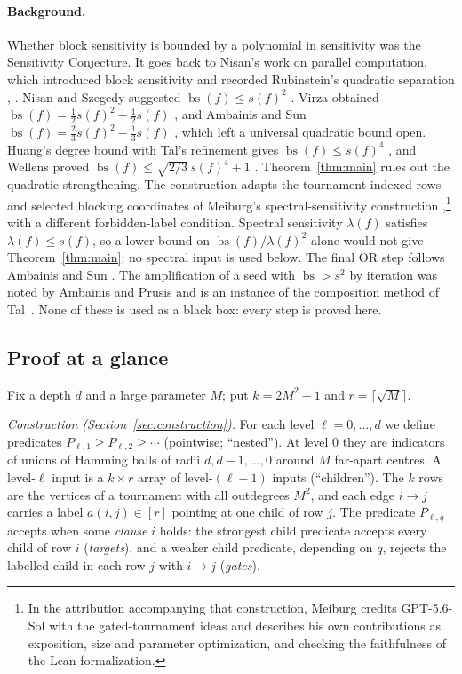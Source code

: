 \documentclass[11pt]{article}
\newcommand{\bs}{\operatorname{bs}}
\theoremstyle{definition}
\theoremstyle{remark}
\begin{document}
\paragraph{Background.}
Whether block sensitivity is bounded by a polynomial in sensitivity was the
Sensitivity Conjecture. It goes back to Nisan's work on parallel computation,
which introduced block sensitivity and recorded Rubinstein's quadratic
separation \cite[Section~2]{Nisan1989}, \cite{Rubinstein1995}. Nisan and
Szegedy suggested $\bs(f)\le s(f)^2$ \cite[Section~4]{NisanSzegedy1994}.
Virza obtained $\bs(f)=\tfrac12s(f)^2+\tfrac12s(f)$ \cite{Virza2011}, and
Ambainis and Sun $\bs(f)=\tfrac23s(f)^2-\tfrac13s(f)$
\cite[Theorem~1]{AmbainisSun2011}, which left a universal quadratic bound
open. Huang's degree bound with Tal's refinement \cite{Tal2013} gives
$\bs(f)\le s(f)^4$ \cite[Theorem~1.5]{Huang2019}, and Wellens proved
$\bs(f)\le\sqrt{2/3}\,s(f)^4+1$ \cite[Corollary~4.2]{Wellens2022}.
Theorem~\ref{thm:main} rules out the quadratic strengthening. The
construction adapts the tournament-indexed rows and selected blocking
coordinates of Meiburg's spectral-sensitivity construction
\cite[Sections~3.1 and~5.2--5.5]{Meiburg2026},\footnote{In the attribution
accompanying that construction, Meiburg credits GPT-5.6-Sol with the
gated-tournament ideas and describes his own contributions as exposition,
size and parameter optimization, and checking the faithfulness of the Lean
formalization.} with a different forbidden-label condition. Spectral
sensitivity $\lambda(f)$ \cite{AaronsonEtAl2021} satisfies
$\lambda(f)\le s(f)$, so a lower bound on $\bs(f)/\lambda(f)^2$ alone would
not give Theorem~\ref{thm:main}; no spectral input is used below. The final
OR step follows Ambainis and Sun \cite[Section~4, Lemma~1]{AmbainisSun2011}.
The amplification of a seed with $\bs>s^2$ by iteration was noted by Ambainis
and Pr\={u}sis \cite[Section~1]{AmbainisPrusis2014} and is an instance of the
composition method of Tal~\cite{Tal2013}. None of these is used as a black
box: every step is proved here.

\subsection{Proof at a glance}

Fix a depth $d$ and a large parameter $M$; put $k=2M^2+1$ and
$r=\lceil\sqrt M\rceil$.

\emph{Construction (Section~\ref{sec:construction}).}
For each level $\ell=0,\ldots,d$ we define predicates
$P_{\ell,1}\ge P_{\ell,2}\ge\cdots$ (pointwise; ``nested''). At level $0$
they are indicators of unions of Hamming balls of radii $d,d-1,\ldots,0$
around $M$ far-apart centres. A level-$\ell$ input is a $k\times r$ array of
level-$(\ell-1)$ inputs (``children''). The $k$ rows are the vertices of a
tournament with all outdegrees $M^2$, and each edge $i\to j$ carries a label
$a(i,j)\in[r]$ pointing at one child of row $j$. The predicate $P_{\ell,q}$
accepts when some \emph{clause} $i$ holds: the strongest child predicate
accepts every child of row $i$ (\emph{targets}), and a weaker child
predicate, depending on $q$, rejects the labelled child in each row $j$ with
$i\to j$ (\emph{gates}).
\end{document}
